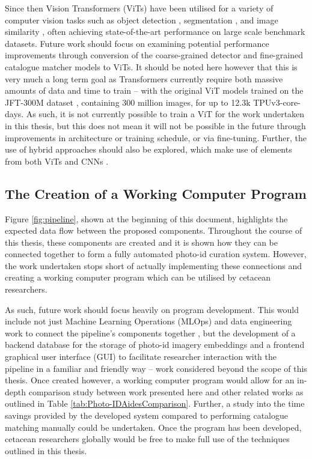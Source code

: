 Since then Vision Transformers (ViTs) have been utilised for a variety of computer vision tasks such as object detection \cite{fang_you_2021, li_exploring_2022}, segmentation \cite{hu_istr_2021, prangemeier_attention-based_2020, wang_end--end_2021}, and image similarity \cite{el-nouby_training_2021}, often achieving state-of-the-art performance on large scale benchmark datasets. Future work should focus on examining potential performance improvements through conversion of the coarse-grained detector and fine-grained catalogue matcher models to ViTs. It should be noted here however that this is very much a long term goal as Transformers currently require both massive amounts of data and time to train -- with the original ViT models trained on the JFT-300M dataset \cite{sun_revisiting_2017}, containing 300 million images, for up to 12.3k TPUv3-core-days. As such, it is not currently possible to train a ViT for the work undertaken in this thesis, but this does not mean it will not be possible in the future through improvements in architecture or training schedule, or via fine-tuning. Further, the use of hybrid approaches should also be explored, which make use of elements from both ViTs and CNNs \cite{liu_convnet_2022, liu_swin_2021}.

\subsection{The Creation of a Working Computer Program}\label{ch:Conclusion,sec:FutureWork,sub:GUI}

Figure \ref{fig:pipeline}, shown at the beginning of this document, highlights the expected data flow between the proposed components. Throughout the course of this thesis, these components are created and it is shown how they can be connected together to form a fully automated photo-id curation system. However, the work undertaken stops short of actually implementing these connections and creating a working computer program which can be utilised by cetacean researchers. 

As such, future work should focus heavily on program development. This would include not just Machine Learning Operations (MLOps) and data engineering work to connect the pipeline's components together \cite{zhou_towards_2020}, but the development of a backend database for the storage of photo-id imagery embeddings and a frontend graphical user interface (GUI) to facilitate researcher interaction with the pipeline in a familiar and friendly way -- work considered beyond the scope of this thesis. Once created however, a working computer program would allow for an in-depth comparison study between work presented here and other related works as outlined in Table \ref{tab:Photo-IDAidesComparison}. Further, a study into the time savings provided by the developed system compared to performing catalogue matching manually could be undertaken. Once the program has been developed, cetacean researchers globally would be free to make full use of the techniques outlined in this thesis. 

